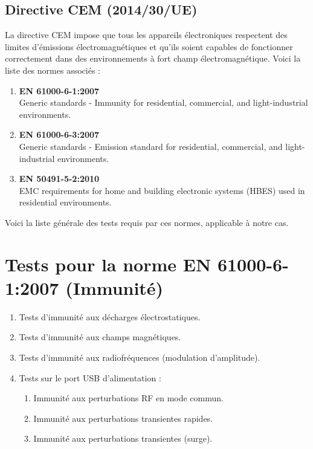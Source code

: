 \documentclass[a4paper,12pt]{article}
\begin{document}
\subsection{Directive CEM (2014/30/UE)}
La directive CEM impose que tous les appareils électroniques respectent des limites d'émissions électromagnétiques et qu'ils soient capables de fonctionner correctement dans des environnements à fort champ électromagnétique.
Voici la liste des normes associés : %
\begin{enumerate}
    \item \textbf{EN 61000-6-1:2007} \\
          Generic standards - Immunity for residential, commercial, and light-industrial environments.

    \item \textbf{EN 61000-6-3:2007} \\
          Generic standards - Emission standard for residential, commercial, and light-industrial environments.

    \item \textbf{EN 50491-5-2:2010} \\
          EMC requirements for home and building electronic systems (HBES) used in residential environments.
\end{enumerate}
Voici la liste générale des tests requis par ces normes, applicable à notre cas.
\section{Tests pour la norme EN 61000-6-1:2007 (Immunité)}
\begin{enumerate}
    \item Tests d'immunité aux décharges électrostatiques.
    \item Tests d'immunité aux champs magnétiques.
    \item Tests d'immunité aux radiofréquences (modulation d'amplitude).
    \item Tests sur le port USB d'alimentation :
          \begin{enumerate}
              \item Immunité aux perturbations RF en mode commun.
              \item Immunité aux perturbations transientes rapides.
              \item Immunité aux perturbations transientes (surge).
          \end{enumerate}
\end{enumerate}
\end{document}
